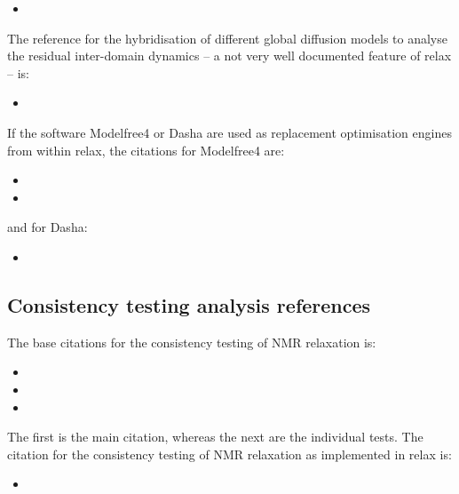 \begin{itemize}
\item {}
\end{itemize}

The reference for the hybridisation of different global diffusion models to analyse the residual inter-domain dynamics -- a not very well documented feature of relax -- is:

\begin{itemize}
\item {}
\end{itemize}

If the software Modelfree4 or Dasha are used as replacement optimisation engines from within relax, the citations for Modelfree4 are:

\begin{itemize}
\item {}
\item {}
\end{itemize}

and for Dasha:

\begin{itemize}
\item {}
\end{itemize}



\subsection*{Consistency testing analysis references}

The base citations for the consistency testing of NMR relaxation is:

\begin{itemize}
\item {}
\item {}
\item {}
\end{itemize}

The first is the main citation, whereas the next are the individual tests.
The citation for the consistency testing of NMR relaxation as implemented in relax is:

\begin{itemize}
\item {}
\end{itemize}


